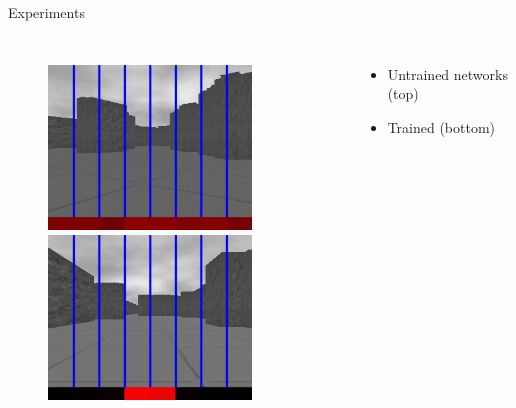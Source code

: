 \documentclass{beamer}
\begin{document}
\begin{frame}{Experiments}
\begin{columns}[c c]
				\begin{figure}
					\begin{center}
						\includegraphics[width=0.8\textwidth]{output_0.jpg}\\
						\includegraphics[width=0.8\textwidth]{output_end.jpg}
					\end{center}
				\end{figure}

				\vspace{-0.6cm}
				\scriptsize
				\begin{itemize}
				\item Untrained networks (top)
				\item Trained (bottom)
				\end{itemize}

		\end{columns}


	\end{frame}
	
\end{document}
